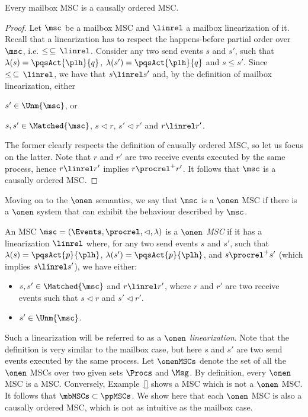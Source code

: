 \begin{proposition}%
	Every mailbox MSC is a causally ordered MSC.
\end{proposition}
\begin{proof}
Let $\msc$ be a mailbox MSC and $\linrel$ a mailbox linearization of it. Recall that a linearization has to respect the happens-before partial order over $\msc$, i.e. $\le \,\subseteq\, \linrel$. Consider any two send events $s$ and $s'$, such that $\lambda(s)=\pqsAct{\plh}{q}$, $\lambda(s')=\pqsAct{\plh}{q}$ and $s \le s'$. Since $\le \,\subseteq\, \linrel$, we have that $s \linrel s'$ and, by the definition of mailbox linearization, either
\begin{enumerate*}[label={(\roman*)}]
	\item $s' \in \Unm{\msc}$, or
	\item $s,s' \in \Matched{\msc}$, $s \lhd r$, $s' \lhd r'$ and $r \linrel r'$.
\end{enumerate*}
The former clearly respects the definition of causally ordered MSC, so let us focus on the latter. Note that $r$ and $r'$ are two receive events executed by the same process, hence $r \linrel r'$ implies $r \procrel^+ r'$. It follows that $\msc$ is a causally ordered MSC.
\end{proof}

\medskip

Moving on to the $\onen$ semantics, we say that $\msc$ is a $\onen$ MSC if there is a $\onen$ system that can exhibit the behaviour described by $\msc$.

\begin{definition}%
An MSC $\msc = (\Events,\procrel,\lhd,\lambda)$ is a \emph{$\onen$ MSC} if it has a linearization $\linrel$ where, for any two send events $s$ and $s'$, such that $\lambda(s)=\pqsAct{p}{\plh}$, $\lambda(s')=\pqsAct{p}{\plh}$, and $s \procrel^+ s'$ (which implies $s \linrel s'$), we have either:
\begin{itemize}\itemsep=0.5ex
	\item $s,s' \in \Matched{\msc}$ and $r \linrel r'$, where $r$ and $r'$ are two receive events such that $s \lhd r$ and $s' \lhd r'$.
	\item $s' \in \Unm{\msc}$.
\end{itemize}
\end{definition}

Such a linearization will be referred to as a \emph{$\onen$ linearization}. Note that the definition is very similar to the mailbox case, but here $s$ and $s'$ are two send events executed by the same process. Let $\onenMSCs$ denote the set of all the $\onen$ MSCs over two given sets $\Procs$ and $\Msg$. By definition, every $\onen$ MSC is a \pp MSC. Conversely, Example~\ref{} shows a \pp MSC which is not a $\onen$ MSC. It follows that $\mbMSCs \subset \ppMSCs$. We show here that each $\onen$ MSC is also a causally ordered MSC, which is not as intuitive as the mailbox case.

